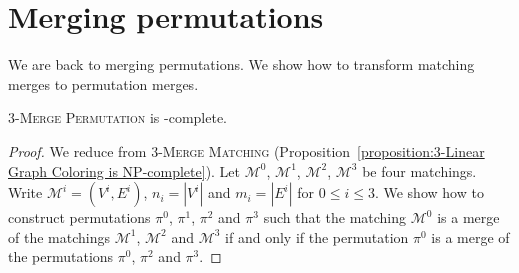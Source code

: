 \section{Merging permutations}
\label{section:Merging permutations}

We are back to merging permutations. 
We show how to transform matching merges to permutation merges.

\begin{proposition}
  \label{proposition:3-merge permutation is NP-complete}
  \textsc{$3$-Merge Permutation} is \NP-complete.
\end{proposition}

\begin{proof}
  We reduce from \textsc{$3$-Merge Matching} (Proposition~\ref{proposition:3-Linear Graph Coloring is NP-complete}).
  Let $\mathcal{M}^{0}$, $\mathcal{M}^{1}$, $\mathcal{M}^{2}$, $\mathcal{M}^{3}$ be four matchings. 
  Write $\mathcal{M}^{i} = (V^i, E^i)$,
  $n_i = |V^i|$ and $m_i = |E^i|$ for $0 \leq i \leq 3$.
  We show how to construct permutations $\pi^0$, $\pi^1$, $\pi^2$ and $\pi^3$ such that
  the matching $\mathcal{M}^{0}$ is a merge of the matchings $\mathcal{M}^{1}$, $\mathcal{M}^{2}$ and $\mathcal{M}^{3}$
  if and only if
  the permutation $\pi^0$ is a merge of the permutations $\pi^0$, $\pi^2$ and $\pi^3$.


\end{proof}
